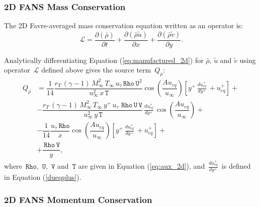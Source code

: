 \documentclass[10pt]{article}
\newcommand{\Diff}[2] {\dfrac{\partial( #1)}{\partial #2}}
\newcommand{\Rho}{\,\mathtt{Rho}}
\newcommand{\U}{\,\mathtt{U}}
\newcommand{\V}{\,\mathtt{V}}
\newcommand{\T}{\,\mathtt{T}}
\newcommand{\Lo}{\,\mathcal{L}}
\newcommand{\Dueqplusyplus}{\, \frac{du_{eq}^+}{dy^+}\,}
\newcommand{\brho}{\bar{\rho}}
\newcommand{\tu}{\tilde{u}}
\newcommand{\tv}{\tilde{v}}
\begin{document}
\subsubsection{2D FANS Mass Conservation}

The 2D Favre-averaged mass conservation equation written as an operator is:
\begin{equation*}
  \Lo=\Diff{\brho }{t} +  \Diff{\brho \tu}{x}+\Diff{\brho \tv}{y}.
\end{equation*}

Analytically differentiating Equation (\ref{eq:manufactured_2d}) for $\brho$, $\tu$ and $\tv$ using operator $\Lo$ defined above gives  the source term~$Q_{\brho}$:
\begin{equation}
 \begin{split}
Q_{\brho} &= \dfrac{1}{14}\dfrac{ r_T \, (\gamma-1) \,  M_{\infty}^2 \, T_{\infty} \, u_{\tau}\Rho \U^2 }{\, u_{\infty}^2 \, x \T}\cos\left(\dfrac{A u_{eq}}{u_{\infty}}\right)\left[y^{+} \Dueqplusyplus+u_{eq}^{+}\right] +\\
&-\dfrac{r_T \, (\gamma-1) \, M_{\infty}^2 \, T_{\infty} \,  y^{+} \, u_{\tau} \, \Rho \U \V }{\, u_{\infty}^2 \, y \T} \Dueqplusyplus\cos\left(\dfrac{A u_{eq}}{u_{\infty}}\right)+\\
&-\dfrac{1}{14} \dfrac{u_{\tau} \Rho }{x}\cos\left(\dfrac{A u_{eq}}{u_{\infty}}\right)\left[y^{+} \Dueqplusyplus+u_{eq}^{+}\right] +\\
&+\dfrac{\Rho \V}{y},
 \end{split}
\end{equation}
where $\Rho,\,\U,\,\V$ and $\T$ are given in Equation (\ref{eq:aux_2d}), and $\displaystyle\Dueqplusyplus$ is defined in Equation (\ref{dueqplus}). 

\subsubsection{2D FANS Momentum Conservation}
\end{document}
